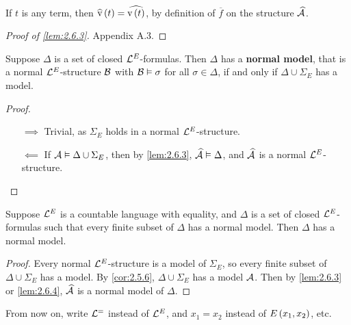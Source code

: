 \begin{note*}
If $ t $ is any term, then $ \widehat{\v}\br{t} = \widehat{\v\br{t}} $, by definition of $ \overline{f} $ on the structure $ \widehat{\mathcal{A}} $.
\end{note*}

\begin{proof}[Proof of \ref{lem:2.6.3}]
Appendix A.3.
\end{proof}

\begin{lemma}
\label{lem:2.6.4}
Suppose $ \Delta $ is a set of closed $ \mathcal{L}^E $-formulas. Then $ \Delta $ has a \textbf{normal model}, that is a normal $ \mathcal{L}^E $-structure $ \mathcal{B} $ with $ \mathcal{B} \vDash \sigma $ for all $ \sigma \in \Delta $, if and only if $ \Delta \cup \Sigma_E $ has a model.
\end{lemma}

\begin{proof}
\hfill
\begin{itemize}
\item[$ \implies $] Trivial, as $ \Sigma_E $ holds in a normal $ \mathcal{L}^E $-structure.
\item[$ \impliedby $] If $ \mathcal{A} \vDash \Delta \cup \Sigma_E $, then by \ref{lem:2.6.3}, $ \widehat{\mathcal{A}} \vDash \Delta $, and $ \widehat{\mathcal{A}} $ is a normal $ \mathcal{L}^E $-structure.
\end{itemize}
\end{proof}

\begin{theorem}
Suppose $ \mathcal{L}^E $ is a countable language with equality, and $ \Delta $ is a set of closed $ \mathcal{L}^E $-formulas such that every finite subset of $ \Delta $ has a normal model. Then $ \Delta $ has a normal model.
\end{theorem}

\begin{proof}
Every normal $ \mathcal{L}^E $-structure is a model of $ \Sigma_E $, so every finite subset of $ \Delta \cup \Sigma_E $ has a model. By \ref{cor:2.5.6}, $ \Delta \cup \Sigma_E $ has a model $ \mathcal{A} $. Then by \ref{lem:2.6.3} or \ref{lem:2.6.4}, $ \widehat{\mathcal{A}} $ is a normal model of $ \Delta $.
\end{proof}

\begin{notation*}
From now on, write $ \mathcal{L}^= $ instead of $ \mathcal{L}^E $, and $ x_1 = x_2 $ instead of $ E\br{x_1, x_2} $, etc.
\end{notation*}

